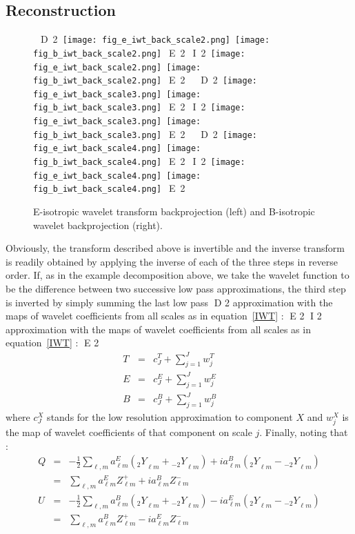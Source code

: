 \subsection*{Reconstruction}
\begin{figure*}[htb]
\centerline{
\vbox{
 \hbox{
D 2
 \texttt{[image: fig\_e\_iwt\_back\_scale2.png]}
 \texttt{[image: fig\_b\_iwt\_back\_scale2.png]}
E 2
I 2
 \texttt{[image: fig\_e\_iwt\_back\_scale2.png]}
 \texttt{[image: fig\_b\_iwt\_back\_scale2.png]}
E 2
 }
  \hbox{
D 2
 \texttt{[image: fig\_e\_iwt\_back\_scale3.png]}
 \texttt{[image: fig\_b\_iwt\_back\_scale3.png]}
E 2
I 2
 \texttt{[image: fig\_e\_iwt\_back\_scale3.png]}
 \texttt{[image: fig\_b\_iwt\_back\_scale3.png]}
E 2
 }
 \hbox{
D 2
 \texttt{[image: fig\_e\_iwt\_back\_scale4.png]}
 \texttt{[image: fig\_b\_iwt\_back\_scale4.png]}
E 2
I 2
 \texttt{[image: fig\_e\_iwt\_back\_scale4.png]}
 \texttt{[image: fig\_b\_iwt\_back\_scale4.png]}
E 2
 }
 }
 }
\caption{E-isotropic wavelet transform backprojection (left) and B-isotropic wavelet backprojection (right).}
\label{fig_eb_iwt_back}
\end{figure*}
Obviously, the transform described above is invertible and the inverse transform is readily obtained by applying the inverse 
of each of the three steps in reverse order. If, as in the example decomposition above, we take the wavelet function to be 
the difference between two successive low pass approximations, the third step is inverted by simply summing the last low pass 
D 2
approximation with the maps of wavelet coefficients from all scales as in equation~\ref{IWT} : 
E 2
I 2
approximation with the maps of wavelet coefficients from all scales as in equation~\eqref{IWT} : 
E 2
\begin{eqnarray}
T  & = & c_{J}^T + \sum_{j=1}^{J} w_j^T \quad \quad \nonumber \\
E & = & c_{J}^E + \sum_{j=1}^{J} w_j^E \quad \quad \nonumber \\
B & = &  c_{J}^B + \sum_{j=1}^{J} w_j^B
\end{eqnarray}
where $c_{J}^X$ stands for the low resolution approximation to component $X$ and $w_j^X$ is the map of wavelet coefficients of that component on scale $j$. Finally, noting that : 
\begin{eqnarray}
Q  & =  & -\frac{1}{2} \sum_{\ell, m}   a_{\ell m} ^E   ( {_{ 2} Y}_{\ell m} +  {_{ -2} Y}_{\ell m} ) +  i a_{\ell m} ^B ( {_{ 2} Y}_{\ell m} -  {_{ -2} Y}_{\ell m} )  \nonumber \\
     & =  & \sum_{\ell, m}   a_{\ell m} ^E   Z_{\ell m}^+ +  i a_{\ell m} ^B Z_{\ell m}^-   \\ \nonumber
U  & =   & -\frac{1}{2} \sum_{\ell, m}   a_{\ell m} ^B   ( {_{ 2} Y}_{\ell m} +  {_{ -2} Y}_{\ell m} ) -  i a_{\ell m} ^E ( {_{ 2} Y}_{\ell m} -  {_{ -2} Y}_{\ell m} )  \nonumber \\
      & =  & \sum_{\ell, m}   a_{\ell m} ^B Z_{\ell m}^+ -  i a_{\ell m} ^E Z_{\ell m}^-   
\end{eqnarray}
